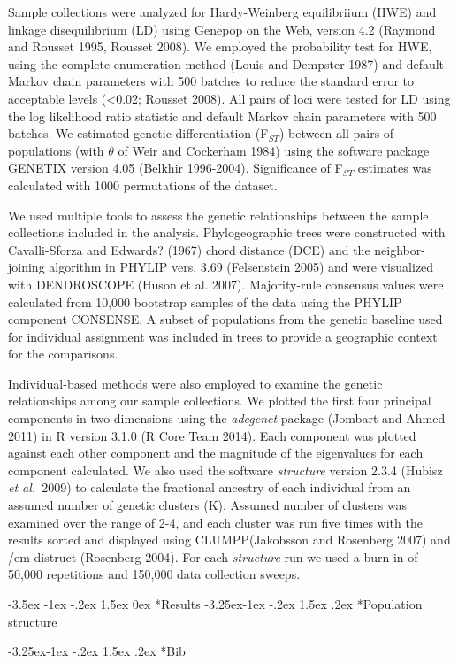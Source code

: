 \documentclass[twoside,10pt,twocolumn]{article}
\makeatletter
\newcommand{\etal}{{\em et al.}\ }
\renewcommand\section{\@startsection {section}{1}{\z@}%
                                   {-3.5ex \@plus -1ex \@minus -.2ex}%
                                   {1.5ex \@plus 0ex}%
                                   {\normalfont\normalsize\bfseries}}
\renewcommand\subsection{\@startsection{subsection}{2}{\z@}%
                                     {-3.25ex\@plus -1ex \@minus -.2ex}%
                                     {1.5ex \@plus .2ex}%
                                     {\normalfont\normalsize\itshape}}
\makeatother
\begin{document}
Sample collections were analyzed for Hardy-Weinberg equilibriium (HWE) and linkage disequilibrium (LD) using Genepop on the Web, version 4.2 (Raymond and Rousset 1995, Rousset 2008). We employed the probability test for HWE, using the complete enumeration method (Louis and Dempster 1987) and default Markov chain parameters with 500 batches to reduce the standard error to acceptable levels (<0.02; Rousset 2008).  All pairs of loci were tested for LD using the log likelihood ratio statistic and default Markov chain parameters with 500 batches.  We estimated genetic differentiation (F$_{ST}$) between all pairs of populations (with $\theta$ of Weir and Cockerham 1984) using the software package GENETIX version 4.05 (Belkhir 1996-2004). Significance of F$_{ST}$ estimates was calculated with 1000 permutations of the dataset. 

We used multiple tools to assess the genetic relationships between the sample collections included in the analysis. Phylogeographic trees were constructed with Cavalli-Sforza and Edwards? (1967) chord distance (DCE) and the neighbor-joining algorithm in PHYLIP vers. 3.69 (Felsenstein 2005) and were visualized with DENDROSCOPE (Huson et al. 2007). Majority-rule consensus values were calculated from 10,000 bootstrap samples of the data using the PHYLIP component CONSENSE.  A subset of populations from the genetic baseline used for individual assignment was included in trees to provide a geographic context for the comparisons. 

Individual-based methods were also employed to examine the genetic relationships among our sample collections. We plotted the first four principal components in two dimensions using the {\em adegenet} package (Jombart and Ahmed 2011) in R version 3.1.0 (R Core Team 2014). Each component was plotted against each other component and the magnitude of the eigenvalues for each component calculated. We also used the software {\em structure} version 2.3.4 (Hubisz \etal 2009) to calculate the fractional ancestry of each individual from an assumed number of genetic clusters (K). Assumed number of clusters was examined over the range of 2-4, and each cluster was run five times with the results sorted and displayed using CLUMPP(Jakobsson and Rosenberg 2007) and {/em distruct} (Rosenberg 2004). For each {\em structure} run we used a burn-in of 50,000 repetitions and 150,000 data collection sweeps.




\section*{Results}
\subsection*{Population structure}

\subsection*{Bib}
%

 
\end{document}
